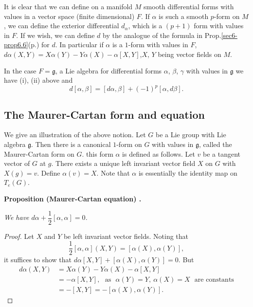 It is clear that we can define on a manifold $M$ smooth differential forms with values in a vector space (finite dimensional) $F$. If $\alpha$ is such a smooth $p$-form on $M$, we can define the exterior differential $d_{\alpha}$, which is a $(p+1)$ form with values in $F$. If we wish, we can define $d$ by the analogue of the formula in Prop.\ref{sec6-prop6.6}(p.\pageref{page30}) for $d$. In particular if $\alpha$ is a $1$-form with values in $F$, $d\alpha(X,Y)=X\alpha(Y)-Y\alpha(X)-\alpha[X,Y]$,\pageoriginale $X$, $Y$ being vector fields on $M$.

In the case $F=\mathfrak{g}$, a Lie algebra for differential forms $\alpha$, $\beta$, $\gamma$ with values in $\mathfrak{g}$ we have (i), (ii) above and 
$$
d[\alpha,\beta]=[d\alpha,\beta]+(-1)^{p}[\alpha,d\beta].
$$

\subsection*{The Maurer-Cartan form and equation}

We give an illustration of the above notion. Let $G$ be a Lie group with Lie algebra $\mathfrak{g}$. Then there is a canonical $1$-form on $G$ with values in $\mathfrak{g}$, called the Maurer-Cartan form on $G$. this form $\alpha$ is defined as follows. Let $v$ be a tangent vector of $G$ at $g$. There exists a unique left invariant vector field $X$ on $G$ with $X(g)=v$. Define $\alpha(v)=X$. Note that $\alpha$ is essentially the identity map on $T_{e}(G)$.

\medskip

\noindent
{\bf Proposition (Maurer-Cartan equation) .\label{sec11-prop11.3}}

{\em We have $d\alpha+\dfrac{1}{2}[\alpha,\alpha]=0$.}

\begin{proof}
Let $X$ and $Y$ be left invariant vector fields. Noting that 
$$
\dfrac{1}{2}[\alpha,\alpha](X,Y)=[\alpha(X),\alpha(Y)],
$$ 
it suffices to show that $d\alpha[X,Y]+[\alpha(X),\alpha(Y)]=0$. But
\begin{align*}
d\alpha(X,Y) &= X\alpha(Y)-Y\alpha(X)-\alpha[X,Y]\\[3pt]
             &= -\alpha[X,Y],\text{~ as~ }\alpha(Y)=Y, \ \alpha(X)=X\text{~ are constants}\\[3pt]
             &= -[X,Y]=-[\alpha(X),\alpha(Y)].
\end{align*}
\end{proof}

